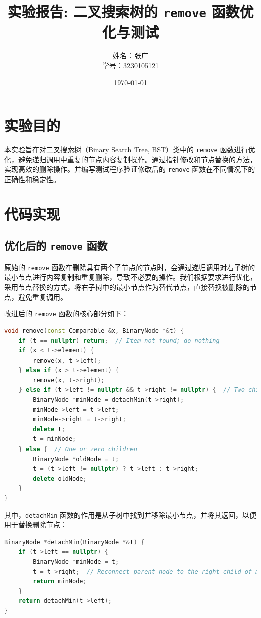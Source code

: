 \documentclass[UTF8]{ctexart}
\title{实验报告: 二叉搜索树的 \texttt{remove} 函数优化与测试}
\author{姓名：张广 \\ 学号：3230105121}
\date{\today}
\begin{document}
\maketitle

\section{实验目的}
本实验旨在对二叉搜索树（Binary Search Tree, BST）类中的 \texttt{remove} 函数进行优化，避免递归调用中重复的节点内容复制操作。通过指针修改和节点替换的方法，实现高效的删除操作。并编写测试程序验证修改后的 \texttt{remove} 函数在不同情况下的正确性和稳定性。

\section{代码实现}

\subsection{优化后的 \texttt{remove} 函数}
原始的 \texttt{remove} 函数在删除具有两个子节点的节点时，会通过递归调用对右子树的最小节点进行内容复制和重复删除，导致不必要的操作。我们根据要求进行优化，采用节点替换的方式，将右子树中的最小节点作为替代节点，直接替换被删除的节点，避免重复调用。

改进后的 \texttt{remove} 函数的核心部分如下：

\begin{lstlisting}[language=C++,caption=remove 函数的实现]
void remove(const Comparable &x, BinaryNode *&t) {
    if (t == nullptr) return;  // Item not found; do nothing
    if (x < t->element) {
        remove(x, t->left);
    } else if (x > t->element) {
        remove(x, t->right);
    } else if (t->left != nullptr && t->right != nullptr) {  // Two children
        BinaryNode *minNode = detachMin(t->right);
        minNode->left = t->left;
        minNode->right = t->right;
        delete t;
        t = minNode;
    } else {  // One or zero children
        BinaryNode *oldNode = t;
        t = (t->left != nullptr) ? t->left : t->right;
        delete oldNode;
    }
}
\end{lstlisting}

其中，\texttt{detachMin} 函数的作用是从子树中找到并移除最小节点，并将其返回，以便用于替换删除节点：

\begin{lstlisting}[language=C++,caption=detachMin 函数的实现]
BinaryNode *detachMin(BinaryNode *&t) {
    if (t->left == nullptr) {
        BinaryNode *minNode = t;
        t = t->right;  // Reconnect parent node to the right child of minNode
        return minNode;
    }
    return detachMin(t->left);
}
\end{lstlisting}
\end{document}
